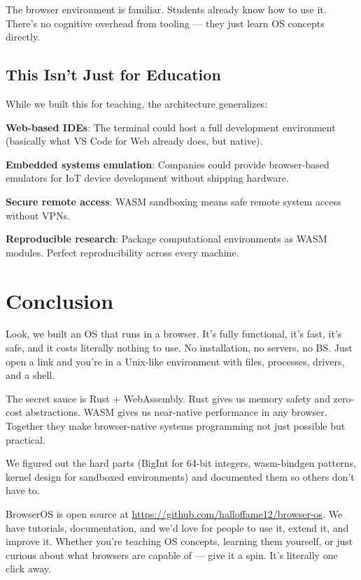 \documentclass[conference]{IEEEtran}
\begin{document}
The browser environment is familiar. Students already know how to use it. There's no cognitive overhead from tooling — they just learn OS concepts directly.

\subsection{This Isn't Just for Education}

While we built this for teaching, the architecture generalizes:

\textbf{Web-based IDEs}: The terminal could host a full development environment (basically what VS Code for Web already does, but native).

\textbf{Embedded systems emulation}: Companies could provide browser-based emulators for IoT device development without shipping hardware.

\textbf{Secure remote access}: WASM sandboxing means safe remote system access without VPNs.

\textbf{Reproducible research}: Package computational environments as WASM modules. Perfect reproducibility across every machine.

\section{Conclusion}

Look, we built an OS that runs in a browser. It's fully functional, it's fast, it's safe, and it costs literally nothing to use. No installation, no servers, no BS. Just open a link and you're in a Unix-like environment with files, processes, drivers, and a shell.

The secret sauce is Rust + WebAssembly. Rust gives us memory safety and zero-cost abstractions. WASM gives us near-native performance in any browser. Together they make browser-native systems programming not just possible but practical.

We figured out the hard parts (BigInt for 64-bit integers, wasm-bindgen patterns, kernel design for sandboxed environments) and documented them so others don't have to.

BrowserOS is open source at \url{https://github.com/halloffame12/browser-os}. We have tutorials, documentation, and we'd love for people to use it, extend it, and improve it. Whether you're teaching OS concepts, learning them yourself, or just curious about what browsers are capable of — give it a spin. It's literally one click away.
\end{document}
